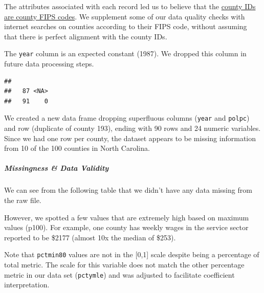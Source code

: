 \documentclass[]{article}
\newenvironment{Shaded}{\begin{snugshade}}{\end{snugshade}}
\newcommand{\DataTypeTok}[1]{\textcolor[rgb]{0.13,0.29,0.53}{#1}}
\newcommand{\KeywordTok}[1]{\textcolor[rgb]{0.13,0.29,0.53}{\textbf{#1}}}
\newcommand{\NormalTok}[1]{#1}
\newcommand{\OperatorTok}[1]{\textcolor[rgb]{0.81,0.36,0.00}{\textbf{#1}}}
\newcommand{\StringTok}[1]{\textcolor[rgb]{0.31,0.60,0.02}{#1}}
\let\oldsubparagraph\subparagraph
\renewcommand{\subparagraph}[1]{\oldsubparagraph{#1}\mbox{}}
\begin{document}
The attributes associated with each record led us to believe that the
\href{https://www.lib.ncsu.edu/gis/countfips}{county IDs are county FIPS
codes}. We supplement some of our data quality checks with internet
searches on counties according to their FIPS code, without assuming that
there is perfect alignment with the county IDs.

The \texttt{year} column is an expected constant (1987). We dropped this
column in future data processing steps.

\begin{Shaded}
\end{Shaded}

\begin{verbatim}
## 
##   87 <NA> 
##   91    0
\end{verbatim}

We created a new data frame dropping superfluous columns (\texttt{year}
and \texttt{polpc}) and row (duplicate of county 193), ending with 90
rows and 24 numeric variables. Since we had one row per county, the
dataset appears to be missing information from 10 of the 100 counties in
North Carolina.

\begin{Shaded}
\end{Shaded}

\hypertarget{missingness-data-validity}{%
\subparagraph{Missingness \& Data
Validity}\label{missingness-data-validity}}

We can see from the following table that we didn't have any data missing
from the raw file.

However, we spotted a few values that are extremely high based on
maximum values (p100). For example, one county has weekly wages in the
service sector reported to be \$2177 (almost 10x the median of \$253).

Note that \texttt{pctmin80} values are not in the {[}0,1{]} scale
despite being a percentage of total metric. The scale for this variable
does not match the other percentage metric in our data set
(\texttt{pctymle}) and was adjusted to facilitate coefficient
interpretation.
\end{document}
